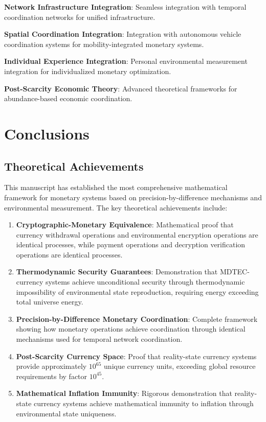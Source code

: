 \documentclass[12pt,a4paper]{article}
\begin{document}
\textbf{Network Infrastructure Integration}: Seamless integration with temporal coordination networks for unified infrastructure.

\textbf{Spatial Coordination Integration}: Integration with autonomous vehicle coordination systems for mobility-integrated monetary systems.

\textbf{Individual Experience Integration}: Personal environmental measurement integration for individualized monetary optimization.

\textbf{Post-Scarcity Economic Theory}: Advanced theoretical frameworks for abundance-based economic coordination.

\section{Conclusions}

\subsection{Theoretical Achievements}

This manuscript has established the most comprehensive mathematical framework for monetary systems based on precision-by-difference mechanisms and environmental measurement. The key theoretical achievements include:

\begin{enumerate}
\item \textbf{Cryptographic-Monetary Equivalence}: Mathematical proof that currency withdrawal operations and environmental encryption operations are identical processes, while payment operations and decryption verification operations are identical processes.

\item \textbf{Thermodynamic Security Guarantees}: Demonstration that MDTEC-currency systems achieve unconditional security through thermodynamic impossibility of environmental state reproduction, requiring energy exceeding total universe energy.

\item \textbf{Precision-by-Difference Monetary Coordination}: Complete framework showing how monetary operations achieve coordination through identical mechanisms used for temporal network coordination.

\item \textbf{Post-Scarcity Currency Space}: Proof that reality-state currency systems provide approximately $10^{65}$ unique currency units, exceeding global resource requirements by factor $10^{45}$.

\item \textbf{Mathematical Inflation Immunity}: Rigorous demonstration that reality-state currency systems achieve mathematical immunity to inflation through environmental state uniqueness.
\end{enumerate}
\end{document}
